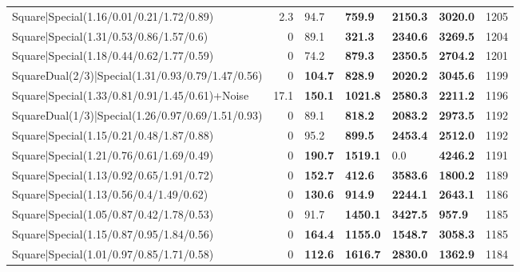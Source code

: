 \begin{tabular}{lrllllr}
 Square|Special(1.16/0.01/0.21/1.72/0.89)                      &             2.3 & 94.7           & \textbf{759.9}  & \textbf{2150.3} & \textbf{3020.0} &         1205 \\
 Square|Special(1.31/0.53/0.86/1.57/0.6)                       &             0   & 89.1           & \textbf{321.3}  & \textbf{2340.6} & \textbf{3269.5} &         1204 \\
 Square|Special(1.18/0.44/0.62/1.77/0.59)                      &             0   & 74.2           & \textbf{879.3}  & \textbf{2350.5} & \textbf{2704.2} &         1201 \\
 SquareDual(2/3)|Special(1.31/0.93/0.79/1.47/0.56)             &             0   & \textbf{104.7} & \textbf{828.9}  & \textbf{2020.2} & \textbf{3045.6} &         1199 \\
 Square|Special(1.33/0.81/0.91/1.45/0.61)+Noise                &            17.1 & \textbf{150.1} & \textbf{1021.8} & \textbf{2580.3} & \textbf{2211.2} &         1196 \\
 SquareDual(1/3)|Special(1.26/0.97/0.69/1.51/0.93)             &             0   & 89.1           & \textbf{818.2}  & \textbf{2083.2} & \textbf{2973.5} &         1192 \\
 Square|Special(1.15/0.21/0.48/1.87/0.88)                      &             0   & 95.2           & \textbf{899.5}  & \textbf{2453.4} & \textbf{2512.0} &         1192 \\
 Square|Special(1.21/0.76/0.61/1.69/0.49)                      &             0   & \textbf{190.7} & \textbf{1519.1} & 0.0             & \textbf{4246.2} &         1191 \\
 Square|Special(1.13/0.92/0.65/1.91/0.72)                      &             0   & \textbf{152.7} & \textbf{412.6}  & \textbf{3583.6} & \textbf{1800.2} &         1189 \\
 Square|Special(1.13/0.56/0.4/1.49/0.62)                       &             0   & \textbf{130.6} & \textbf{914.9}  & \textbf{2244.1} & \textbf{2643.1} &         1186 \\
 Square|Special(1.05/0.87/0.42/1.78/0.53)                      &             0   & 91.7           & \textbf{1450.1} & \textbf{3427.5} & \textbf{957.9}  &         1185 \\
 Square|Special(1.15/0.87/0.95/1.84/0.56)                      &             0   & \textbf{164.4} & \textbf{1155.0} & \textbf{1548.7} & \textbf{3058.3} &         1185 \\
 Square|Special(1.01/0.97/0.85/1.71/0.58)                      &             0   & \textbf{112.6} & \textbf{1616.7} & \textbf{2830.0} & \textbf{1362.9} &         1184 \\

\end{tabular}
